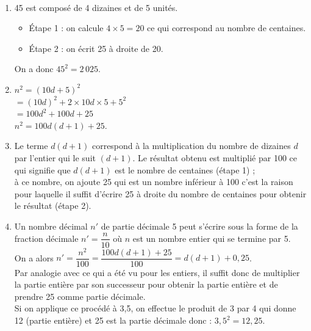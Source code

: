 \begin{corrige}
\ \\ [-5mm]
   \begin{enumerate}
      \item 45 est composé de 4 dizaines et de 5 unités.
      \begin{itemize}
         \item Étape 1 : on calcule $4\times5 =20$ ce qui correspond au nombre de centaines.
         \item Étape 2 : on écrit 25 à droite de 20. 
      \end{itemize}
      On a donc {\blue $45^2 =2\,025$.}
      \item $n^2 =(10d+5)^2$ \\
        \hspace*{0.8cm} $=(10d)^2+2\times10d\times5+5^2$ \\
         \hspace*{0.8cm} $=100d^2+100d+25$ \\
         \hspace*{0.4cm} {\blue $n^2 =100d(d+1)+25.$}
   \end{enumerate}
   
\Coupe

   \begin{enumerate}
   \setcounter{enumi}{2}
      \item Le terme \og $d(d+1)$ \fg{} correspond à la multiplication du nombre de dizaines $d$ par l'entier qui le suit $(d+1)$. Le résultat obtenu est multiplié par 100 ce qui signifie que $d(d+1)$ est le nombre de centaines (étape 1) ; \\
         à ce nombre, on ajoute 25 qui est un nombre inférieur à 100 c'est la raison pour laquelle il suffit d'écrire 25 à droite du nombre de centaines pour obtenir le résultat (étape 2).
      \item Un nombre décimal $n'$ de partie décimale 5 peut s'écrire sous la forme de la fraction décimale $n' =\dfrac{n}{10}$ où $n$ est un nombre entier qui se termine par 5. \\
         On a alors $n' =\dfrac{n^2}{100} =\dfrac{100d(d+1)+25}{100} =d(d+1)+0,25$. \\ [1mm]
         Par analogie avec ce qui a été vu pour les entiers, il suffit donc de multiplier la partie entière par son successeur pour obtenir la partie entière et de prendre 25 comme partie décimale. \\
         Si on applique ce procédé à 3,5, on effectue le produit de 3 par 4 qui donne 12 (partie entière) et 25 est la partie décimale donc : {\blue $3,5^2 =12,25$.}
   \end{enumerate}
\end{corrige}


